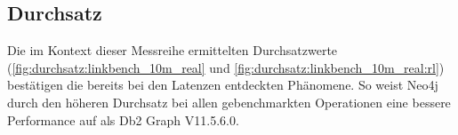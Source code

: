 \begin{table}[!ht]
\centering
{}
\caption{Latenz Linkbench-Real-10M Neo4j getLinkList}
\label{tab:latenz_10m_real:neo4j:gll}
\end{table}

\subsection{Durchsatz}
Die im Kontext dieser Messreihe ermittelten Durchsatzwerte (\autoref{fig:durchsatz:linkbench_10m_real} und \ref{fig:durchsatz:linkbench_10m_real:rl}) bestätigen die bereits bei den Latenzen entdeckten Phänomene. So weist Neo4j durch den höheren Durchsatz bei allen gebenchmarkten Operationen eine bessere Performance auf als Db2 Graph V11.5.6.0. 

